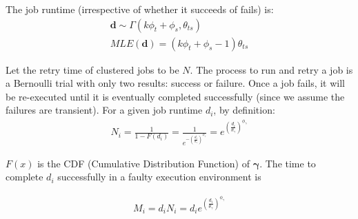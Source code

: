 \documentclass{IOS-Book-Article}
\begin{document}
The job runtime (irrespective of whether it succeeds of fails) is:
\begin{eqnarray}
\displaystyle
\bm{d}\sim\Gamma(k\phi_{t}+\phi_{s}, \theta_{ts})\\
MLE(\bm{d})=\displaystyle{(k\phi_t+\phi_s - 1) }{\theta_{ts}}
\label{eq:N}
\end{eqnarray}


Let the retry time of clustered jobs to be $N$. The process to run and retry a job is a Bernoulli trial with only two results: success or failure. Once a job fails, it will be re-executed until it is eventually completed successfully (since we assume the failures are transient). For a given job runtime $d_i$, by definition:
\begin{eqnarray}
\displaystyle
N_i=\frac{1}{1-F(d_i)}=\frac{1}{e^{-(\displaystyle\frac{d_i}{\theta_{\gamma}})^{\phi_{\gamma}}}}=e^{(\displaystyle\frac{d_i}{\theta_{\gamma}})^{\phi_{\gamma}}} 
\label{eq:N}
\end{eqnarray}

$F(x)$ is the CDF (Cumulative Distribution Function) of $\bm\gamma$. The time to complete $d_i$ successfully in a faulty execution environment is

\begin{eqnarray}
\displaystyle
M_i=d_iN_i=d_ie^{(\displaystyle\frac{d_i}{\theta_{\gamma}})^{\phi_{\gamma}}} 
\label{eq:M}
\end{eqnarray}
\end{document}
